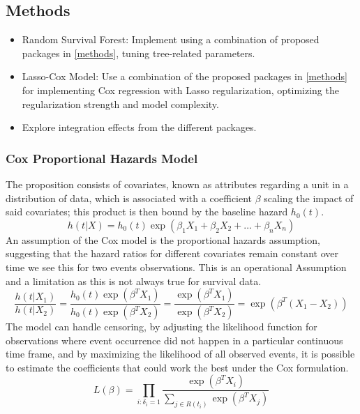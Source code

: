 \subsection{Methods}
\begin{itemize}
\item Random Survival Forest: Implement using a combination of proposed packages in \ref{methods}, tuning tree-related parameters.
\item Lasso-Cox Model: Use a combination of the proposed packages in \ref{methods} for implementing Cox regression with Lasso regularization, optimizing the regularization strength and model complexity. 
\item Explore integration effects from the different packages.
\end{itemize}

\subsubsection{Cox Proportional Hazards Model}
The proposition consists of covariates, known as attributes regarding a unit in a distribution of data, which is associated with a coefficient \(\beta\) scaling the impact of said covariates; this product is then bound by the baseline hazard \(h_{0}(t)\).
\begin{equation} \label{eq:cox}h(t|X) = h_0(t) \exp(\beta_1 X_1 + \beta_2 X_2 + \ldots + \beta_n X_n)\end{equation}
An assumption of the Cox model is the proportional hazards assumption, suggesting that the hazard ratios for different covariates remain constant over time we see this for two events observations. This is an operational Assumption and a limitation as this is not always true for survival data. 
\begin{equation} \label{eq:coxph}\frac{h(t|X_1)}{h(t|X_2)} = \frac{h_0(t) \exp(\beta^T X_1)}{h_0(t) \exp(\beta^T X_2)} = \frac{\exp(\beta^T X_1)}{\exp(\beta^T X_2)} = \exp(\beta^T (X_1 - X_2))\end{equation}
The model can handle censoring, by adjusting the likelihood function for observations where event occurrence did not happen in a particular continuous time frame, and by maximizing the likelihood of all observed events, it is possible to estimate the coefficients that could work the best under the Cox formulation.
\begin{equation} \label{eq:coxlikely}L(\beta) = \prod_{i: \delta_i = 1} \frac{\exp(\beta^T X_i)}{\sum_{j \in R(t_i)} \exp(\beta^T X_j)}\end{equation}

